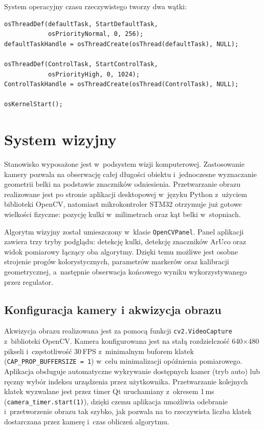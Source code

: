 System operacyjny czasu rzeczywistego tworzy dwa wątki:

\begin{lstlisting}[style=cstyle, caption={Tworzenie zadań FreeRTOS (main.c)}]
osThreadDef(defaultTask, StartDefaultTask,
            osPriorityNormal, 0, 256);
defaultTaskHandle = osThreadCreate(osThread(defaultTask), NULL);

osThreadDef(ControlTask, StartControlTask,
            osPriorityHigh, 0, 1024);
ControlTaskHandle = osThreadCreate(osThread(ControlTask), NULL);

osKernelStart();
\end{lstlisting}

\section{System wizyjny}
\label{sec:wizja}

Stanowisko wyposażone jest w~podsystem wizji komputerowej. Zastosowanie kamery
pozwala na obserwację całej długości obiektu i~jednoczesne wyznaczanie geometrii
belki na podstawie znaczników odniesienia. Przetwarzanie obrazu realizowane jest
po stronie aplikacji desktopowej w~języku Python z~użyciem biblioteki OpenCV,
natomiast mikrokontroler STM32 otrzymuje już gotowe wielkości fizyczne: pozycję
kulki w~milimetrach oraz kąt belki w~stopniach.

Algorytm wizyjny został umieszczony w~klasie \texttt{OpenCVPanel}. Panel aplikacji
zawiera trzy tryby podglądu: detekcję kulki, detekcję znaczników ArUco oraz widok
pomiarowy łączący oba algorytmy. Dzięki temu możliwe jest osobne strojenie progów
kolorystycznych, parametrów markerów oraz kalibracji geometrycznej, a~następnie
obserwacja końcowego wyniku wykorzystywanego przez regulator.

\subsection{Konfiguracja kamery i akwizycja obrazu}

Akwizycja obrazu realizowana jest za pomocą funkcji \texttt{cv2.VideoCapture}
z~biblioteki OpenCV.
Kamera konfigurowana jest na stałą rozdzielczość 640$\times$480 pikseli
i~częstotliwość 30\,FPS z~minimalnym buforem klatek (\texttt{CAP\_PROP\_BUFFERSIZE = 1})
w~celu minimalizacji opóźnienia pomiarowego.
Aplikacja obsługuje automatyczne wykrywanie dostępnych kamer (tryb auto)
lub ręczny wybór indeksu urządzenia przez użytkownika.
Przetwarzanie kolejnych klatek wyzwalane jest przez timer Qt uruchamiany
z~okresem 1\,ms (\texttt{camera\_timer.start(1)}), dzięki czemu aplikacja umożliwia 
odebranie i~przetworzenie obrazu tak szybko, jak pozwala na to rzeczywista liczba
klatek dostarczana przez kamerę i~czas obliczeń algorytmu.

